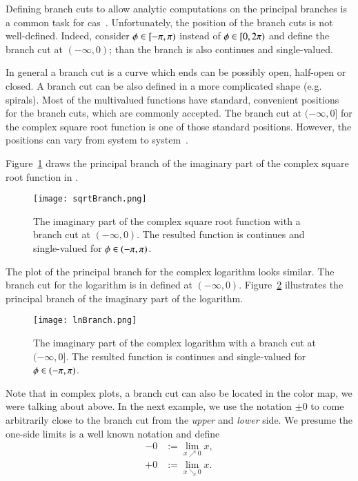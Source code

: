 Defining branch cuts to allow analytic computations on the principal branches is a common task for \gls{cas}~\parencite{Maple:Cuts}. Unfortunately, the position of the branch cuts is not well-defined. Indeed, consider $\phi \in [-{\pi},{\pi})$ instead of $\phi \in [0,2{\pi})$ and define the branch cut at $(-\infty, 0)$; than the branch is also continues and single-valued. 

In general a branch cut is a curve which ends can be possibly open, half-open or closed. A branch cut can be also defined in a more complicated shape (e.g. spirals). Most of the multivalued functions have standard, convenient positions for the branch cuts, which are commonly accepted. The branch cut at $(-\infty, 0]$ for the complex square root function is one of those standard positions. However, the positions can vary from system to system~\parencite{Branches:acot}.

Figure~\ref{fig:sqrtBranch} draws the principal branch of the imaginary part of the complex square root function in \Maple.
 
\begin{figure}[ht]
	\centering
	\texttt{[image: sqrtBranch.png]}
	\caption{The imaginary part of the complex square root function with a branch cut at $(-\infty, 0)$. The resulted function is continues and single-valued for $\phi \in (-{\pi}, {\pi})$.}
	\label{fig:sqrtBranch}
\end{figure}

The plot of the principal branch for the complex logarithm looks similar. The branch cut for the logarithm is in \Maple{} defined at $(-\infty,0)$. Figure~\ref{fig:lnBranch} illustrates the principal branch of the imaginary part of the logarithm.

\begin{figure}[H]
	\centering
	\texttt{[image: lnBranch.png]}
	\caption{The imaginary part of the complex logarithm with a branch cut at $(-\infty, 0]$. The resulted function is continues and single-valued for $\phi \in (-{\pi}, {\pi})$.}
	\label{fig:lnBranch}
\end{figure}

Note that in complex plots, a branch cut can also be located in the color map, we were talking about above. In the next example, we use the notation $\pm 0$ to come arbitrarily close to the branch cut from the \textit{upper} and \textit{lower} side. We presume the one-side limits is a well known notation and define
\begin{align}
-0 &:= \underset{x\nearrow 0}{\lim}x,\\
+0 &:= \underset{x\searrow 0}{\lim}x.
\end{align}

